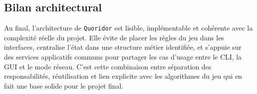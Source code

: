 \subsection{Bilan architectural}

Au final, l'architecture de \texttt{Quoridor} est lisible, implémentable et
cohérente avec la complexité réelle du projet. Elle évite de placer les règles
du jeu dans les interfaces, centralise l'état dans une structure métier
identifiée, et s'appuie sur des services applicatifs communs pour partager les
cas d'usage entre le CLI, la GUI et le mode réseau. C'est cette combinaison
entre séparation des responsabilités, réutilisation et lien explicite avec les
algorithmes du jeu qui en fait une base solide pour le projet final.
